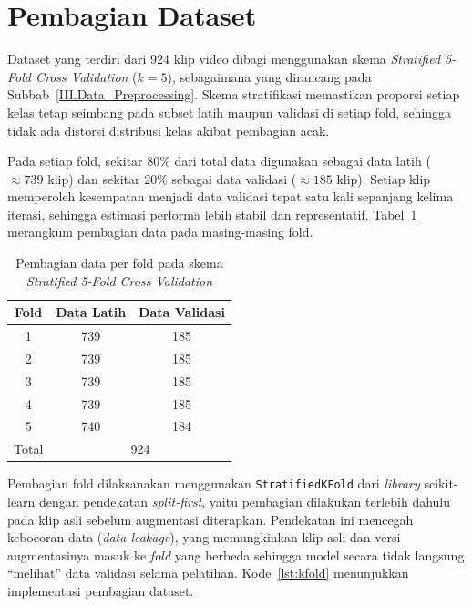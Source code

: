 \section{Pembagian Dataset} \label{IV.Pembagian}

Dataset yang terdiri dari 924 klip video dibagi menggunakan skema \textit{Stratified 5-Fold Cross Validation} ($k=5$), sebagaimana yang dirancang pada Subbab~\ref{III.Data_Preprocessing}. Skema stratifikasi memastikan proporsi setiap kelas tetap seimbang pada subset latih maupun validasi di setiap fold, sehingga tidak ada distorsi distribusi kelas akibat pembagian acak.\par

Pada setiap fold, sekitar 80\% dari total data digunakan sebagai data latih ($\approx739$ klip) dan sekitar 20\% sebagai data validasi ($\approx185$ klip). Setiap klip memperoleh kesempatan menjadi data validasi tepat satu kali sepanjang kelima iterasi, sehingga estimasi performa lebih stabil dan representatif. Tabel~\ref{tab:4.fold_split} merangkum pembagian data pada masing-masing fold.\par

\begin{table}[H]
\centering
\caption{Pembagian data per fold pada skema \textit{Stratified 5-Fold Cross Validation}}
\label{tab:4.fold_split}
{\setlength{\tabcolsep}{3pt}
\footnotesize
\begin{tabular}{|c|c|c|}
\hline
Fold & Data Latih & Data Validasi \\
\hline
1 & 739 & 185 \\
\hline
2 & 739 & 185 \\
\hline
3 & 739 & 185 \\
\hline
4 & 739 & 185 \\
\hline
5 & 740 & 184 \\
\hline
Total & \multicolumn{2}{c|}{924} \\
\hline
\end{tabular}
}
\end{table}

Pembagian fold dilaksanakan menggunakan \texttt{StratifiedKFold} dari \textit{library} scikit-learn dengan pendekatan \textit{split-first}, yaitu pembagian dilakukan terlebih dahulu pada klip asli sebelum augmentasi diterapkan. Pendekatan ini mencegah kebocoran data (\textit{data leakage}), yang memungkinkan klip asli dan versi augmentasinya masuk ke \textit{fold} yang berbeda sehingga model secara tidak langsung ``melihat'' data validasi selama pelatihan. Kode~\ref{lst:kfold} menunjukkan implementasi pembagian dataset.\par

